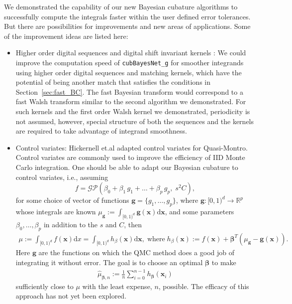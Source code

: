\documentclass{iitthesis}          %
\newcommand{\bm}[1]{\boldsymbol{#1}}
\newcommand{\dif}[1]{\text{d}{#1}}
\newcommand{\reals}{\mathbb{R}}
\newcommand{\vbeta}{{\bm{\beta}}}
\newcommand{\vg}{\bm{g}}
\newcommand{\vx}{\bm{x}}
\newcommand{\dx}{\dif{{x}}}
\newcommand{\dvx}{\dif{\bm{x}}}
\newcommand{\code}[1]{\texttt{#1}}
\begin{document}
{{{{{{

We demonstrated the capability of our new Bayesian cubature algorithms to successfully compute the integrals faster within the user defined error tolerances. But there are possibilities for improvements and new areas of applications.
Some of the improvement ideas are listed here:
\begin{itemize}
\item Higher order digital sequences and digital shift invariant kernels \cite{Nuyens2013} \cite{Bald12a}:
We could improve the computation speed of \code{cubBayesNet\_g} for smoother integrands using higher order digital sequences and matching kernels, which have the potential of being another match that satisfies the conditions in Section~\ref{sec:fast_BC}.  The fast Bayesian transform would correspond to a fast Walsh transform similar to the second algorithm we demonstrated.  For such kernels and the first order Walsh kernel we demonstrated, periodicity is not assumed, however, special structure of both the sequences and the kernels are required to take advantage of integrand smoothness.

\item Control variates:
Hickernell et.al \cite{HicEtal17a} \cite{Li16a} adapted control variates for Quasi-Montro. 
Control variates are commonly used to improve the efficiency of IID Monte Carlo integration.
One should be able to adapt our Bayesian cubature to control variates, i.e., assuming  
\begin{equation*}
f = \mathcal{GP} \left( \beta_0 + \beta_1 \, g_1 + \dots + \beta_p \, g_p, \;s^2 C \right),
\end{equation*}
for some choice of vector of functions $\vg = \{g_1, \ldots, g_p\}$, where $\vg : [0,1)^d \to \reals^p$ whose integrals are known $\mu_{\vg} := \int_{[0,1)^d} \vg(\vx)\dvx$, and some parameters $\beta_0, \ldots, \beta_p$ in addition to the $s$ and $C$, then
\begin{align*}
\mu :=
\int_{[0,1)^d} f(\vx) \dx =
\int_{[0,1)^d} h_{\beta} (\vx) \dvx,  \; \text{where} \;
h_{\beta}(\vx) := f(\vx) + \vbeta^T
(\mu_{\vg} - \vg(\vx)).
\end{align*}
Here $\vg$ are the functions on which the QMC method does a good job of integrating it without error. 
The goal is to choose an optimal $\vbeta$ to make
\begin{align*}
\widehat{\mu}_{\vbeta,n} :=
\frac 1n \sum_{i=0}^{n-1} h_{\vbeta} (\vx_i)
\end{align*}
sufficiently close to $\mu$ with the least expense, $n$, possible.
The efficacy of this approach has not yet been explored.











\end{itemize}}}}}}}
\end{document}
